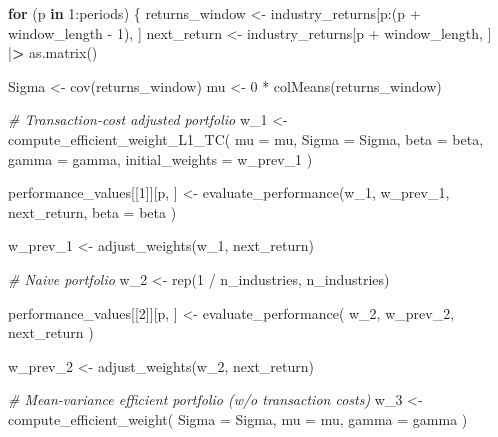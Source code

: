 \documentclass[
]{book}
\newenvironment{Shaded}{\begin{snugshade}}{\end{snugshade}}
\newcommand{\AttributeTok}[1]{\textcolor[rgb]{0.61,0.61,0.61}{#1}}
\newcommand{\CommentTok}[1]{\textcolor[rgb]{0.37,0.37,0.37}{\textit{#1}}}
\newcommand{\ControlFlowTok}[1]{\textcolor[rgb]{0.27,0.27,0.27}{\textbf{#1}}}
\newcommand{\DecValTok}[1]{\textcolor[rgb]{0.06,0.06,0.06}{#1}}
\newcommand{\ErrorTok}[1]{\textcolor[rgb]{0.14,0.14,0.14}{\textbf{#1}}}
\newcommand{\FunctionTok}[1]{\textcolor[rgb]{0,0,0}{#1}}
\newcommand{\NormalTok}[1]{#1}
\newcommand{\OtherTok}[1]{\textcolor[rgb]{0.37,0.37,0.37}{#1}}
\newcommand{\SpecialCharTok}[1]{\textcolor[rgb]{0,0,0}{#1}}
\begin{document}
\begin{Shaded}
\begin{Highlighting}[]
\ControlFlowTok{for}\NormalTok{ (p }\ControlFlowTok{in} \DecValTok{1}\SpecialCharTok{:}\NormalTok{periods) \{}
\NormalTok{  returns\_window }\OtherTok{\textless{}{-}}\NormalTok{ industry\_returns[p}\SpecialCharTok{:}\NormalTok{(p }\SpecialCharTok{+}\NormalTok{ window\_length }\SpecialCharTok{{-}} \DecValTok{1}\NormalTok{), ]}
\NormalTok{  next\_return }\OtherTok{\textless{}{-}}\NormalTok{ industry\_returns[p }\SpecialCharTok{+}\NormalTok{ window\_length, ] }\SpecialCharTok{|}\ErrorTok{\textgreater{}} \FunctionTok{as.matrix}\NormalTok{()}

\NormalTok{  Sigma }\OtherTok{\textless{}{-}} \FunctionTok{cov}\NormalTok{(returns\_window)}
\NormalTok{  mu }\OtherTok{\textless{}{-}} \DecValTok{0} \SpecialCharTok{*} \FunctionTok{colMeans}\NormalTok{(returns\_window)}

  \CommentTok{\# Transaction{-}cost adjusted portfolio}
\NormalTok{  w\_1 }\OtherTok{\textless{}{-}} \FunctionTok{compute\_efficient\_weight\_L1\_TC}\NormalTok{(}
    \AttributeTok{mu =}\NormalTok{ mu,}
    \AttributeTok{Sigma =}\NormalTok{ Sigma,}
    \AttributeTok{beta =}\NormalTok{ beta,}
    \AttributeTok{gamma =}\NormalTok{ gamma,}
    \AttributeTok{initial\_weights =}\NormalTok{ w\_prev\_1}
\NormalTok{  )}

\NormalTok{  performance\_values[[}\DecValTok{1}\NormalTok{]][p, ] }\OtherTok{\textless{}{-}} \FunctionTok{evaluate\_performance}\NormalTok{(w\_1,}
\NormalTok{    w\_prev\_1,}
\NormalTok{    next\_return,}
    \AttributeTok{beta =}\NormalTok{ beta}
\NormalTok{  )}

\NormalTok{  w\_prev\_1 }\OtherTok{\textless{}{-}} \FunctionTok{adjust\_weights}\NormalTok{(w\_1, next\_return)}

  \CommentTok{\# Naive portfolio}
\NormalTok{  w\_2 }\OtherTok{\textless{}{-}} \FunctionTok{rep}\NormalTok{(}\DecValTok{1} \SpecialCharTok{/}\NormalTok{ n\_industries, n\_industries)}

\NormalTok{  performance\_values[[}\DecValTok{2}\NormalTok{]][p, ] }\OtherTok{\textless{}{-}} \FunctionTok{evaluate\_performance}\NormalTok{(}
\NormalTok{    w\_2,}
\NormalTok{    w\_prev\_2,}
\NormalTok{    next\_return}
\NormalTok{  )}

\NormalTok{  w\_prev\_2 }\OtherTok{\textless{}{-}} \FunctionTok{adjust\_weights}\NormalTok{(w\_2, next\_return)}

  \CommentTok{\# Mean{-}variance efficient portfolio (w/o transaction costs)}
\NormalTok{  w\_3 }\OtherTok{\textless{}{-}} \FunctionTok{compute\_efficient\_weight}\NormalTok{(}
    \AttributeTok{Sigma =}\NormalTok{ Sigma,}
    \AttributeTok{mu =}\NormalTok{ mu,}
    \AttributeTok{gamma =}\NormalTok{ gamma}
\NormalTok{  )}


\end{Highlighting}
\end{Shaded}
\end{document}
